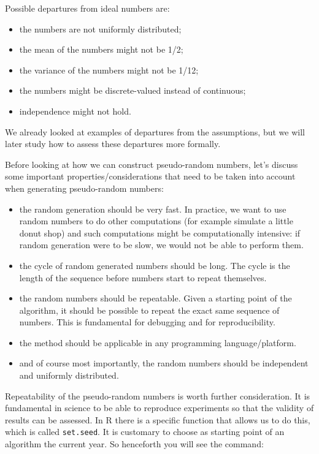 \documentclass[
]{book}
\begin{document}
Possible departures from ideal numbers are:

\begin{itemize}
\item
  the numbers are not uniformly distributed;
\item
  the mean of the numbers might not be 1/2;
\item
  the variance of the numbers might not be 1/12;
\item
  the numbers might be discrete-valued instead of continuous;
\item
  independence might not hold.
\end{itemize}

We already looked at examples of departures from the assumptions, but we will later study how to assess these departures more formally.

Before looking at how we can construct pseudo-random numbers, let's discuss some important properties/considerations that need to be taken into account when generating pseudo-random numbers:

\begin{itemize}
\item
  the random generation should be very fast. In practice, we want to use random numbers to do other computations (for example simulate a little donut shop) and such computations might be computationally intensive: if random generation were to be slow, we would not be able to perform them.
\item
  the cycle of random generated numbers should be long. The cycle is the length of the sequence before numbers start to repeat themselves.
\item
  the random numbers should be repeatable. Given a starting point of the algorithm, it should be possible to repeat the exact same sequence of numbers. This is fundamental for debugging and for reproducibility.
\item
  the method should be applicable in any programming language/platform.
\item
  and of course most importantly, the random numbers should be independent and uniformly distributed.
\end{itemize}

Repeatability of the pseudo-random numbers is worth further consideration. It is fundamental in science to be able to reproduce experiments so that the validity of results can be assessed. In R there is a specific function that allows us to do this, which is called \texttt{set.seed}. It is customary to choose as starting point of an algorithm the current year. So henceforth you will see the command:
\end{document}
